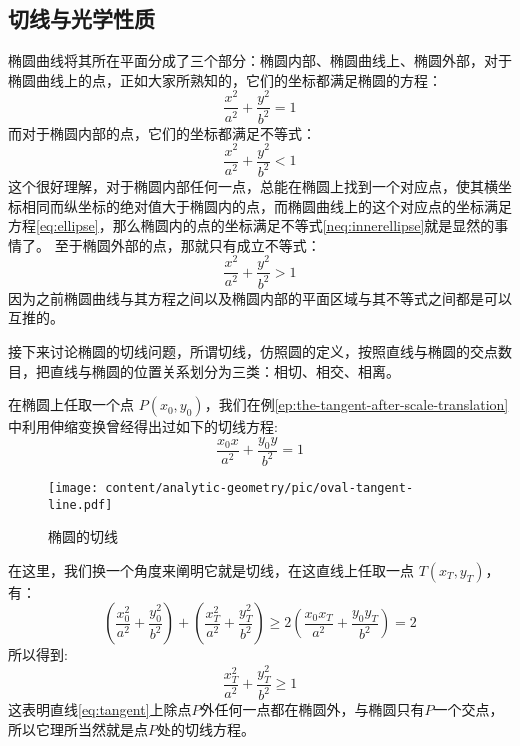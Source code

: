 \subsection{切线与光学性质}
\label{sec:oval-tangent}

椭圆曲线将其所在平面分成了三个部分：椭圆内部、椭圆曲线上、椭圆外部，对于椭圆曲线上的点，正如大家所熟知的，它们的坐标都满足椭圆的方程：
\begin{equation}
\frac{x^2}{a^2}+\frac{y^2}{b^2}=1 \label{eq:ellipse}
\end{equation}
而对于椭圆内部的点，它们的坐标都满足不等式：
\begin{equation}
\frac{x^2}{a^2}+\frac{y^2}{b^2}<1 \label{neq:innerellipse}
\end{equation}
这个很好理解，对于椭圆内部任何一点，总能在椭圆上找到一个对应点，使其横坐标相同而纵坐标的绝对值大于椭圆内的点，而椭圆曲线上的这个对应点的坐标满足方程\ref{eq:ellipse}，那么椭圆内的点的坐标满足不等式\ref{neq:innerellipse}就是显然的事情了。
至于椭圆外部的点，那就只有成立不等式：
\begin{equation}
\frac{x^2}{a^2}+\frac{y^2}{b^2}>1 \label{neq:outerellipse}
\end{equation}
因为之前椭圆曲线与其方程之间以及椭圆内部的平面区域与其不等式之间都是可以互推的。

接下来讨论椭圆的切线问题，所谓切线，仿照圆的定义，按照直线与椭圆的交点数目，把直线与椭圆的位置关系划分为三类：相切、相交、相离。

在椭圆上任取一个点 $P(x_0,y_0)$，我们在例\ref{ep:the-tangent-after-scale-translation}中利用伸缩变换曾经得出过如下的切线方程:
\begin{equation}
\frac{x_0x}{a^2}+\frac{y_0y}{b^2}=1 \label{eq:tangent}
\end{equation}
\begin{center}
\end{center}

\begin{figure}[htbp]
  \centering
\texttt{[image: content/analytic-geometry/pic/oval-tangent-line.pdf]}
\caption{椭圆的切线}
\label{fig:oval-tangent-line}
\end{figure}

在这里，我们换一个角度来阐明它就是切线，在这直线上任取一点 $T(x_T,y_T)$，有：
\begin{equation}
(\frac{x_0^2}{a^2}+\frac{y_0^2}{b^2})+(\frac{x_T^2}{a^2}+\frac{y_T^2}{b^2}) \geqslant 2(\frac{x_0x_T}{a^2}+\frac{y_0y_T}{b^2})=2
\end{equation}
所以得到:
\begin{equation}
\frac{x_T^2}{a^2}+\frac{y_T^2}{b^2} \geqslant 1
\end{equation}
这表明直线\ref{eq:tangent}上除点$P$外任何一点都在椭圆外，与椭圆只有$P$一个交点，所以它理所当然就是点$P$处的切线方程。

